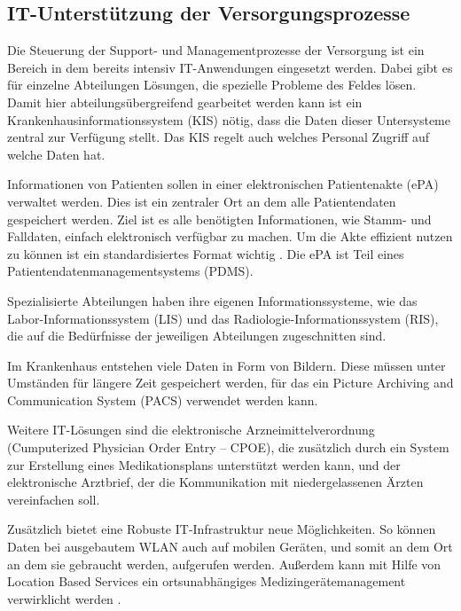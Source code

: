 \subsection{IT-Unterstützung der Versorgungsprozesse}
Die Steuerung der Support- und Managementprozesse der Versorgung ist ein Bereich in dem bereits intensiv IT-Anwendungen eingesetzt werden. Dabei gibt es für einzelne Abteilungen Lösungen, die spezielle Probleme des Feldes lösen. Damit hier abteilungsübergreifend gearbeitet werden kann ist ein Krankenhausinformationssystem (KIS) nötig, dass die Daten dieser Untersysteme zentral zur Verfügung stellt. Das KIS regelt auch welches Personal Zugriff auf welche Daten hat. 

Informationen von Patienten sollen in einer elektronischen Patientenakte (ePA) verwaltet werden. Dies ist ein zentraler Ort an dem alle Patientendaten gespeichert werden. Ziel ist es alle benötigten Informationen, wie Stamm- und Falldaten, einfach elektronisch verfügbar zu machen. Um die Akte effizient nutzen zu können ist ein standardisiertes Format wichtig \parencite{oswald2019}. Die ePA ist Teil eines Patientendatenmanagementsystems (PDMS). 

Spezialisierte Abteilungen haben ihre eigenen Informationssysteme, wie das Labor-Informationssystem (LIS) und das Radiologie-Informationssystem (RIS), die auf die Bedürfnisse der jeweiligen Abteilungen zugeschnitten sind.

Im Krankenhaus entstehen viele Daten in Form von Bildern. Diese müssen unter Umständen für längere Zeit gespeichert werden, für das ein Picture Archiving and Communication System (PACS) verwendet werden kann. 

Weitere IT-Lösungen sind die elektronische Arzneimittelverordnung (Cumputerized Physician Order Entry -- CPOE), die zusätzlich durch ein System zur Erstellung eines Medikationsplans unterstützt werden kann, und der elektronische Arztbrief, der die Kommunikation mit niedergelassenen Ärzten vereinfachen soll. \parencite{braeutigam2017}

Zusätzlich bietet eine Robuste IT-Infrastruktur neue Möglichkeiten. So können Daten bei ausgebautem WLAN auch auf mobilen Geräten, und somit an dem Ort an dem sie gebraucht werden, aufgerufen werden. Außerdem kann mit Hilfe von Location Based Services ein ortsunabhängiges Medizingerätemanagement verwirklicht werden \parencite{mci/Leimeister2006}.

